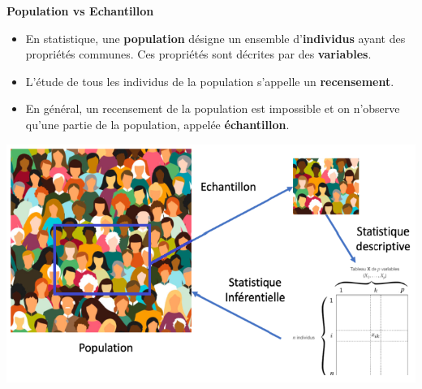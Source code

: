 \documentclass[aspectratio=169,xcolor=dvipsnames]{beamer}
\begin{document}
\begin{frame}
	\begin{block}{\textbf{Population vs Echantillon}}
		\begin{itemize}
		\item En statistique, une \textbf{population} désigne un ensemble d'\textbf{individus} ayant des propriétés communes. Ces propriétés sont décrites par des \textbf{variables}.
		\item L'étude de tous les individus de la population s'appelle un \textbf{recensement}.
		\item En général, un recensement de la population est impossible et on n'observe qu'une partie de la population, appelée \textbf{échantillon}.
		\end{itemize}
	\begin{center}
	\includegraphics[scale=0.32]{pop_vs_sample.png}
	\end{center}
	\end{block}
\end{frame}
\end{document}
